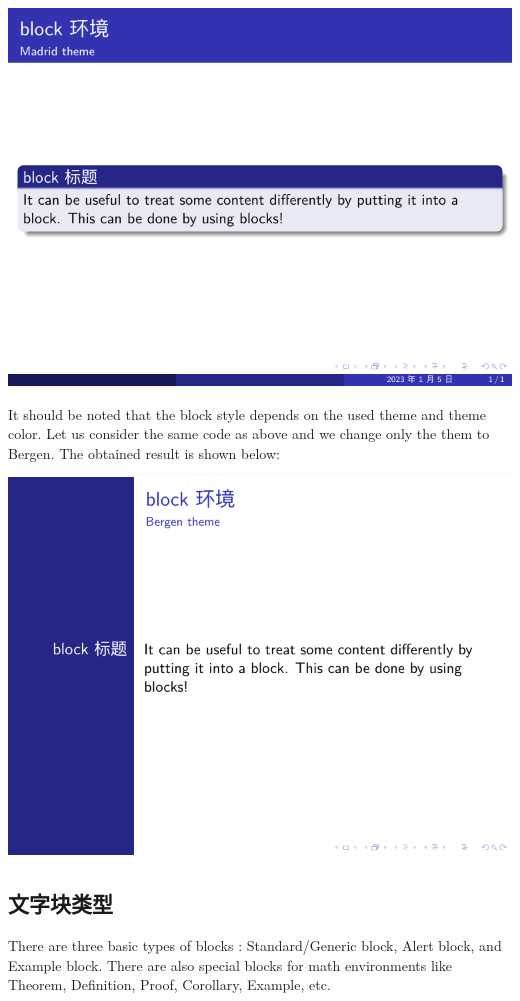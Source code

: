 \includegraphics{examples/beamer/block-simple1.pdf}

It should be noted that the block style depends on the used theme and theme color. Let us consider the same code as above and we change only the them to {\ttfamily Bergen}. The obtained result is shown below:

\includegraphics{examples/beamer/block-simple2.pdf}

\subsection{文字块类型}

There are three basic types of blocks : Standard/Generic block, Alert block, and Example block. There are also special blocks for math environments like Theorem, Definition, Proof, Corollary, Example, etc.

